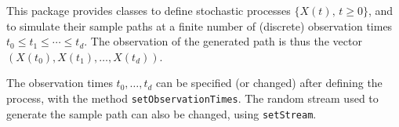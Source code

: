 
This package provides classes to define stochastic processes 
$\{X(t),\, t\ge 0\}$, and to simulate their sample paths at a finite 
number of (discrete) observation times $t_0 \le t_1 \le \cdots \le t_d$.
The observation of the generated path is thus the vector
$(X(t_0),X(t_1),\dots,X(t_d))$.

The observation times $t_0, \dots, t_d$ can be specified (or changed) 
after defining the process, with the method \texttt{setObservationTimes}.
The random stream used to generate the sample path can also be changed,
using \texttt{setStream}.

